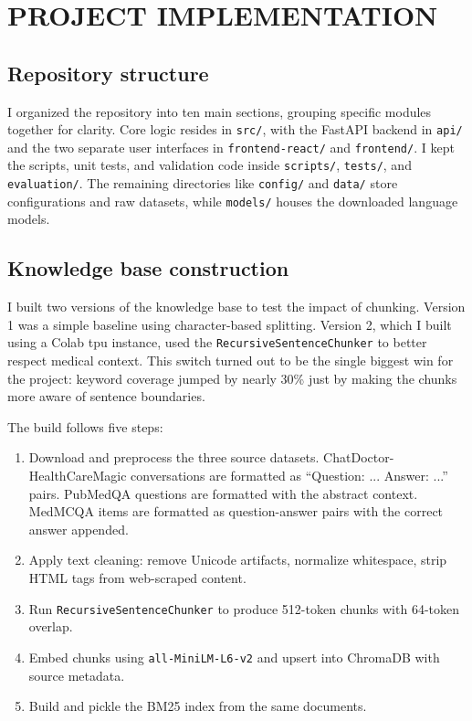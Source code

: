 \chapter{\MakeUppercase{Project Implementation}}

\section{Repository structure}

I organized the repository into ten main sections, grouping specific modules together for clarity. Core logic resides in \texttt{src/}, with the FastAPI backend in \texttt{api/} and the two separate user interfaces in \texttt{frontend-react/} and \texttt{frontend/}. I kept the scripts, unit tests, and validation code inside \texttt{scripts/}, \texttt{tests/}, and \texttt{evaluation/}. The remaining directories like \texttt{config/} and \texttt{data/} store configurations and raw datasets, while \texttt{models/} houses the downloaded language models.

\section{Knowledge base construction}

I built two versions of the knowledge base to test the impact of chunking. Version 1 was a simple baseline using character-based splitting. Version 2, which I built using a Colab \ac{tpu} instance, used the \texttt{RecursiveSentenceChunker} to better respect medical context. This switch turned out to be the single biggest win for the project: keyword coverage jumped by nearly 30\% just by making the chunks more aware of sentence boundaries.

The build follows five steps:

\begin{enumerate}
    \item Download and preprocess the three source datasets. ChatDoctor-HealthCareMagic conversations are formatted as ``Question: ... Answer: ...'' pairs. PubMedQA questions are formatted with the abstract context. MedMCQA items are formatted as question-answer pairs with the correct answer appended.
    \item Apply text cleaning: remove Unicode artifacts, normalize whitespace, strip HTML tags from web-scraped content.
    \item Run \texttt{RecursiveSentenceChunker} to produce 512-token chunks with 64-token overlap.
    \item Embed chunks using \texttt{all-MiniLM-L6-v2} and upsert into ChromaDB with source metadata.
    \item Build and pickle the BM25 index from the same documents.
\end{enumerate}

